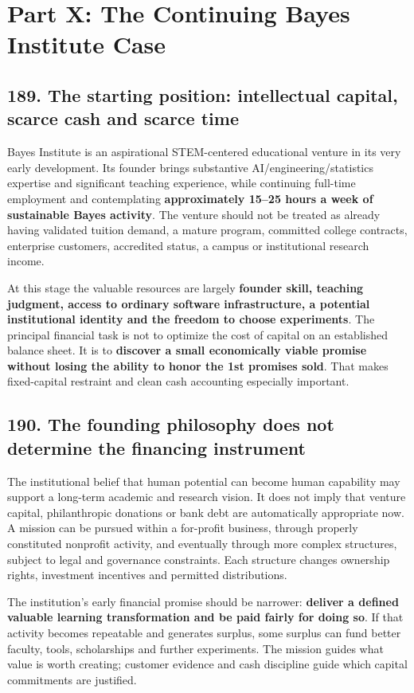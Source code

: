 \section{Part X: The Continuing Bayes Institute Case}

\subsection{189. The starting position: intellectual capital, scarce cash and scarce time}


Bayes Institute is an aspirational STEM-centered educational venture in its very early development. Its founder brings substantive AI/engineering/statistics expertise and significant teaching experience, while continuing full-time employment and contemplating \textbf{approximately 15–25 hours a week of sustainable Bayes activity}. The venture should not be treated as already having validated tuition demand, a mature program, committed college contracts, enterprise customers, accredited status, a campus or institutional research income.

At this stage the valuable resources are largely \textbf{founder skill, teaching judgment, access to ordinary software infrastructure, a potential institutional identity and the freedom to choose experiments}. The principal financial task is not to optimize the cost of capital on an established balance sheet. It is to \textbf{discover a small economically viable promise without losing the ability to honor the 1st promises sold}. That makes fixed-capital restraint and clean cash accounting especially important.

\subsection{190. The founding philosophy does not determine the financing instrument}


The institutional belief that human potential can become human capability may support a long-term academic and research vision. It does not imply that venture capital, philanthropic donations or bank debt are automatically appropriate now. A mission can be pursued within a for-profit business, through properly constituted nonprofit activity, and eventually through more complex structures, subject to legal and governance constraints. Each structure changes ownership rights, investment incentives and permitted distributions.

The institution's early financial promise should be narrower: \textbf{deliver a defined valuable learning transformation and be paid fairly for doing so}. If that activity becomes repeatable and generates surplus, some surplus can fund better faculty, tools, scholarships and further experiments. The mission guides what value is worth creating; customer evidence and cash discipline guide which capital commitments are justified.

